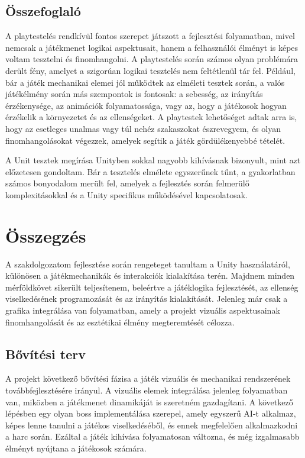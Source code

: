 \documentclass[
]{thesis-ekf}
\theoremstyle{definition}
\theoremstyle{remark}
\begin{document}
\section{Összefoglaló}
A playtestelés rendkívül fontos szerepet játszott a fejlesztési folyamatban, mivel nemcsak a játékmenet logikai aspektusait, hanem a felhasználói élményt is képes voltam tesztelni és finomhangolni.
A playtestelés során számos olyan problémára derült fény, amelyet a szigorúan logikai tesztelés nem feltétlenül tár fel. Például, bár a játék mechanikai elemei jól működtek az elméleti tesztek során, a valós játékélmény során más szempontok is fontosak: a sebesség, az irányítás érzékenysége, az animációk folyamatossága, vagy az, hogy a játékosok hogyan érzékelik a környezetet és az ellenségeket. A playtestek lehetőséget adtak arra is, hogy az esetleges unalmas vagy túl nehéz szakaszokat észrevegyem, és olyan finomhangolásokat végezzek, amelyek segítik a játék gördülékenyebbé tételét.

A Unit tesztek megírása Unityben sokkal nagyobb kihívásnak bizonyult, mint azt előzetesen gondoltam. Bár a tesztelés elmélete egyszerűnek tűnt, a gyakorlatban számos bonyodalom merült fel, amelyek a fejlesztés során felmerülő komplexitásokkal és a Unity specifikus működésével kapcsolatosak.
\chapter*{Összegzés}
A szakdolgozatom fejlesztése során rengeteget tanultam a Unity használatáról, különösen a játékmechanikák és interakciók kialakítása terén. Majdnem minden mérföldkövet sikerült teljesítenem, beleértve a játéklogika fejlesztését, az ellenség viselkedésének programozását és az irányítás kialakítását. Jelenleg már csak a grafika integrálása van folyamatban, amely a projekt vizuális aspektusainak finomhangolását és az esztétikai élmény megteremtését célozza.
\section{Bővítési terv}
A projekt következő bővítési fázisa a játék vizuális és mechanikai rendszerének továbbfejlesztésére irányul. A vizuális elemek integrálása jelenleg folyamatban van, miközben a játékmenet dinamikáját is szeretném gazdagítani. A következő lépésben egy olyan boss implementálása szerepel, amely egyszerű AI-t alkalmaz, képes lenne tanulni a játékos viselkedéséből, és ennek megfelelően alkalmazkodni a harc során. Ezáltal a játék kihívása folyamatosan változna, és még izgalmasabb élményt nyújtana a játékosok számára.
\end{document}
